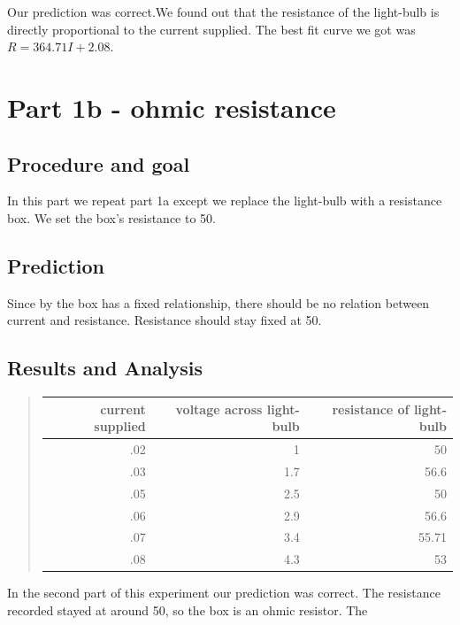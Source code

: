 \documentclass[12pt]{article}
\begin{document}
Our prediction was correct.We found out that the resistance of the light-bulb is directly proportional to the current supplied. The best fit curve we got was $R = 364.71I + 2.08$.
\section*{Part 1b - ohmic resistance}
\subsection*{Procedure and goal}
In this part we repeat part 1a except we replace the light-bulb with a resistance box. We set the box's resistance to 50.
\subsection*{Prediction}
Since by the box has a fixed relationship, there should be no relation between current and resistance. Resistance should stay fixed at 50.
\subsection*{Results and Analysis}
\begin{quote}
	\begin{tabular}{|r|r|r|}
	\hline 
	current supplied & voltage across light-bulb & resistance of light-bulb \\
	\hline 
	.02 & 1 & 50 \\
	.03 & 1.7 & 56.6 \\
	.05 & 2.5 & 50 \\
	.06 & 2.9 & 56.6 \\
	.07 & 3.4 & 55.71 \\
	.08 & 4.3 & 53 \\
	\hline 
	\end{tabular}
\end{quote}
In the second part of this experiment our prediction was correct.  The resistance recorded stayed at around 50, so the box is an ohmic resistor. The
\end{document}

